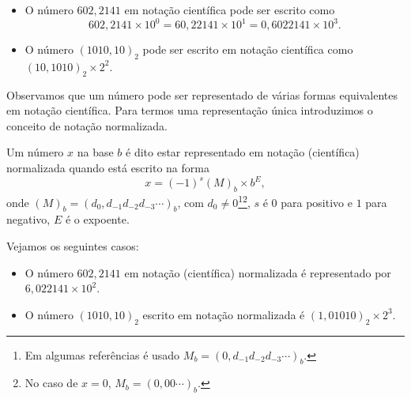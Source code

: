 \begin{ex}
  \begin{itemize}
  \item[a)] O número $602,2141$ em notação científica pode ser escrito como
    \begin{equation}
      602,2141\times 10^0 = 60,22141\times 10^{1} = 0,6022141\times 10^{3}.
    \end{equation}
  \item[b)] O número $(1010,10)_2$ pode ser escrito em notação científica como $(10,1010)_2\times 2^2$.
  \end{itemize}
\end{ex}

Observamos que um número pode ser representado de várias formas equivalentes em notação científica. Para termos uma representação única introduzimos o conceito de notação normalizada.

\begin{defn}
  Um número $x$ na base $b$ é dito estar representado em notação (científica) normalizada quando está escrito na forma
  \begin{equation}
    x=(-1)^{s}(M)_b \times b^{E},
  \end{equation}
onde $(M)_b = (d_0,d_{-1}d_{-2}d_{-3}\cdots)_b$, com $d_{0}\neq 0$\footnote{Em algumas referências é usado $M_b = (0,d_{-1}d_{-2}d_{-3}\cdots)_b$.}\footnote{No caso de $x=0$, $M_b = (0,00\cdots)_b$.}, $s$ é $0$ para positivo e $1$ para negativo, $E$ é o expoente.
 \end{defn}

\begin{ex} Vejamos os seguintes casos:
  \begin{itemize}
  \item[a)] O número $602,2141$ em notação (científica) normalizada é representado por $6,022141\times 10^{2}$.
  \item[b)] O número $(1010,10)_2$ escrito em notação normalizada é $(1,01010)_2\times 2^3$.
  \end{itemize}
\end{ex}

